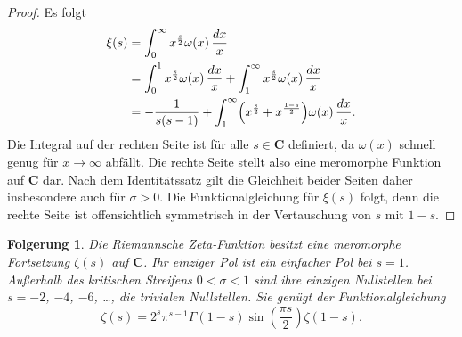 \documentclass[a4paper,twoside,openright]{report}
\newtheorem{cor}[thm]{Folgerung}
\theoremstyle{definition}
\theoremstyle{remark}
\begin{document}
\begin{proof}
  Es folgt
  \[
    \begin{split}
      \xi(s) & = \int_0^\infty x^{\frac s 2} \omega(x) \, \frac{dx} x
      \\
      & = \int_0^1 x^{\frac s 2} \omega(x) \, \frac{dx} x
      + \int_1^\infty x^{\frac s 2} \omega(x) \, \frac{dx} x
      \\
      & = - \frac 1 {s (s - 1)} + \int_1^\infty \Bigl(x^{\frac s 2} + x^{\frac{1 - s} 2}\Bigr) \omega(x) \, \frac{dx}x.
    \end{split}
  \]
  Die Integral auf der rechten Seite ist für alle $s \in \mathbf C$ definiert, da 
  $\omega(x)$ schnell genug für $x \to \infty$ abfällt. Die rechte Seite stellt
  also eine meromorphe Funktion auf $\mathbf C$ dar. Nach dem Identitätssatz
  gilt die Gleichheit beider Seiten daher insbesondere auch für $\sigma > 0$.
  Die Funktionalgleichung für $\xi(s)$ folgt, denn die  
  rechte Seite ist offensichtlich symmetrisch in der Vertauschung von $s$ mit $1 - s$.
\end{proof}

\begin{cor}
  Die Riemannsche Zeta-Funktion besitzt eine meromorphe Fortsetzung $\zeta(s)$
  auf $\mathbf C$. Ihr einziger Pol ist ein einfacher Pol bei $s = 1$. Außerhalb des \emph{kritischen
  Streifens} $0 < \sigma < 1$ sind ihre einzigen Nullstellen bei $s = -2$, $-4$,
  $-6$, \dots, die \emph{trivialen Nullstellen}. Sie genügt der Funktionalgleichung
  \[
    \zeta(s) = 2^s \pi^{s - 1} \Gamma(1 - s) \sin\left(\frac{\pi s} 2\right) \zeta(1 - s).
  \]
\end{cor}
\end{document}

